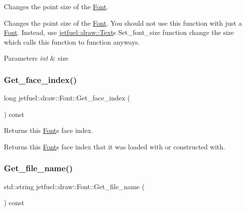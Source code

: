 Changes the point size of the \hyperlink{classjetfuel_1_1draw_1_1Font}{Font}. 

Changes the point size of the \hyperlink{classjetfuel_1_1draw_1_1Font}{Font}. You should not use this function with just a \hyperlink{classjetfuel_1_1draw_1_1Font}{Font}. Instead, use \hyperlink{classjetfuel_1_1draw_1_1Text}{jetfuel\+::draw\+::\+Text}\textquotesingle{}s Set\+\_\+font\+\_\+size function change the size which calls this function to function anyways.


\begin{DoxyParams}{Parameters}
{\em int} & size \\
\hline
\end{DoxyParams}
\mbox{\label{classjetfuel_1_1draw_1_1Font_ad0f24c27c3dcca9839e4ffc1603a1c54}} 
\subsubsection{\texorpdfstring{Get\+\_\+face\+\_\+index()}{Get\_face\_index()}}
{\footnotesize\ttfamily long jetfuel\+::draw\+::\+Font\+::\+Get\+\_\+face\+\_\+index (\begin{DoxyParamCaption}{ }\end{DoxyParamCaption}) const\hspace{0.3cm}{\ttfamily [inline]}}



Returns this \hyperlink{classjetfuel_1_1draw_1_1Font}{Font}\textquotesingle{}s face index. 

Returns this \hyperlink{classjetfuel_1_1draw_1_1Font}{Font}\textquotesingle{}s face index that it was loaded with or constructed with. \mbox{\label{classjetfuel_1_1draw_1_1Font_a497ce6fb60f71fdc8667c5a5ede81cca}} 
\subsubsection{\texorpdfstring{Get\+\_\+file\+\_\+name()}{Get\_file\_name()}}
{\footnotesize\ttfamily std\+::string jetfuel\+::draw\+::\+Font\+::\+Get\+\_\+file\+\_\+name (\begin{DoxyParamCaption}{ }\end{DoxyParamCaption}) const\hspace{0.3cm}{\ttfamily [inline]}}



